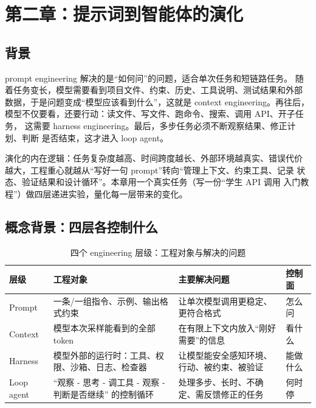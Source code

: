 \clearpage
\section{第二章：提示词到智能体的演化}

\subsection{背景}

prompt engineering 解决的是``如何问''的问题，适合单次任务和短链路任务。
随着任务变长，模型需要看到项目文件、约束、历史、工具说明、测试结果和外部
数据，于是问题变成``模型应该看到什么''，这就是 context engineering。再往后，
模型不仅要看，还要行动：读文件、写文件、跑命令、搜索、调用 API、开子任务，
这需要 harness engineering。最后，多步任务必须不断观察结果、修正计划、判断
是否结束，这才进入 loop agent。

演化的内在逻辑：任务复杂度越高、时间跨度越长、外部环境越真实、错误代价
越大，工程重心就越从``写好一句 prompt''转向``管理上下文、约束工具、记录
状态、验证结果和设计循环''。本章用一个真实任务（写一份``学生 API 调用
入门教程''）做四层递进实验，量化每一层带来的变化。

\subsection{概念背景：四层各控制什么}

\begin{table}[H]
\centering
\caption{四个 engineering 层级：工程对象与解决的问题}
\label{tab:ch2_levels}
\small
\setlength{\tabcolsep}{4pt}
\begin{tabular}{p{2.5cm}p{4.2cm}p{4.2cm}p{3.2cm}}
\toprule
\textbf{层级} & \textbf{工程对象} & \textbf{主要解决问题} & \textbf{控制面} \\
\midrule
Prompt & 一条/一组指令、示例、输出格式约束 & 让单次模型调用更稳定、更符合格式 & 怎么问 \\
Context & 模型本次采样能看到的全部 token & 在有限上下文内放入``刚好需要''的信息 & 看什么 \\
Harness & 模型外部的运行时：工具、权限、沙箱、日志、检查器 & 让模型能安全感知环境、行动、被约束、被验证 & 能做什么 \\
Loop agent & ``观察 - 思考 - 调工具 - 观察 - 判断是否继续'' 的控制循环 & 处理多步、长时、不确定、需反馈修正的任务 & 何时停 \\
\bottomrule
\end{tabular}
\end{table}

